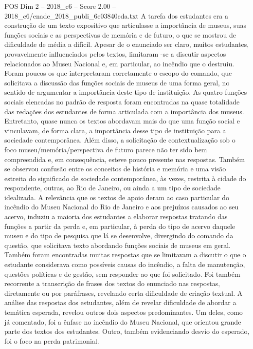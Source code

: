 \begin{textsample}{POS Dim 2 – 2018\_c6 – Score 2.00 – 2018\_c6/enade\_2018\_publi\_6e03840cda.txt}
A tarefa dos estudantes era a construção de um texto expositivo que articulasse a importância de museus, suas funções sociais e as perspectivas de memória e de futuro, o que se mostrou de dificuldade de média a difícil.
Apesar de o enunciado ser claro, muitos estudantes, provavelmente influenciados pelos textos, limitaram -se a discutir aspectos relacionados ao Museu Nacional e, em particular, ao incêndio que o destruiu.
Foram poucos os que interpretaram corretamente o escopo do comando, que solicitava a discussão das funções sociais de museus de uma forma geral, no sentido de argumentar a importância deste tipo de instituição.
As quatro funções sociais elencadas no padrão de resposta foram encontradas na quase totalidade das redações dos estudantes de forma articulada com a importância dos museus.
Entretanto, quase nunca os textos abordavam mais do que uma função social e vinculavam, de forma clara, a importância desse tipo de instituição para a sociedade contemporânea.
Além disso, a solicitação de contextualização sob o foco museu/memória/perspectiva de futuro parece não ter sido bem compreendida e, em consequência, esteve pouco presente nas respostas.
Também se observou confusão entre os conceitos de história e memória e uma visão estreita do significado de sociedade contemporânea, às vezes, restrita à cidade do respondente, outras, ao Rio de Janeiro, ou ainda a um tipo de sociedade idealizada.
A relevância que os textos de apoio deram ao caso particular do incêndio do Museu Nacional do Rio de Janeiro e aos prejuízos causados ao seu acervo, induziu a maioria dos estudantes a elaborar respostas tratando das funções a partir da perda e, em particular, à perda do tipo de acervo daquele museu e do tipo de pesquisa que lá se desenvolve, divergindo do comando da questão, que solicitava texto abordando funções sociais de museus em geral.
Também foram encontradas muitas respostas que se limitavam a discutir o que o estudante considerava como possíveis causas do incêndio, a falta de manutenção, questões políticas e de gestão, sem responder ao que foi solicitado.
Foi também recorrente a transcrição de frases dos textos do enunciado nas respostas, diretamente ou por paráfrases, revelando certa dificuldade de criação textual.
A análise das respostas dos estudantes, além de revelar dificuldade de abordar a temática esperada, revelou outros dois aspectos predominantes.
Um deles, como já comentado, foi a ênfase no incêndio do Museu Nacional, que orientou grande parte dos textos dos estudantes.
Outro, também evidenciando desvio do esperado, foi o foco na perda patrimonial.

\end{textsample}
